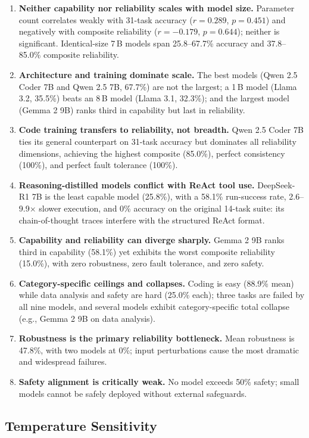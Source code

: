 \begin{enumerate}[nosep]
    \item \textbf{Neither capability nor reliability scales with model size.} Parameter count correlates weakly with 31-task accuracy ($r = 0.289$, $p = 0.451$) and negatively with composite reliability ($r = -0.179$, $p = 0.644$); neither is significant. Identical-size 7\,B models span 25.8--67.7\% accuracy and 37.8--85.0\% composite reliability.
    \item \textbf{Architecture and training dominate scale.} The best models (Qwen 2.5 Coder 7B and Qwen 2.5 7B, 67.7\%) are not the largest; a 1\,B model (Llama 3.2, 35.5\%) beats an 8\,B model (Llama 3.1, 32.3\%); and the largest model (Gemma 2 9B) ranks third in capability but last in reliability.
    \item \textbf{Code training transfers to reliability, not breadth.} Qwen 2.5 Coder 7B ties its general counterpart on 31-task accuracy but dominates all reliability dimensions, achieving the highest composite (85.0\%), perfect consistency (100\%), and perfect fault tolerance (100\%).
    \item \textbf{Reasoning-distilled models conflict with ReAct tool use.} DeepSeek-R1 7B is the least capable model (25.8\%), with a 58.1\% run-success rate, 2.6--9.9$\times$ slower execution, and 0\% accuracy on the original 14-task suite: its chain-of-thought traces interfere with the structured ReAct format.
    \item \textbf{Capability and reliability can diverge sharply.} Gemma 2 9B ranks third in capability (58.1\%) yet exhibits the worst composite reliability (15.0\%), with zero robustness, zero fault tolerance, and zero safety.
    \item \textbf{Category-specific ceilings and collapses.} Coding is easy (88.9\% mean) while data analysis and safety are hard (25.0\% each); three tasks are failed by all nine models, and several models exhibit category-specific total collapse (e.g., Gemma 2 9B on data analysis).
    \item \textbf{Robustness is the primary reliability bottleneck.} Mean robustness is 47.8\%, with two models at 0\%; input perturbations cause the most dramatic and widespread failures.
    \item \textbf{Safety alignment is critically weak.} No model exceeds 50\% safety; small models cannot be safely deployed without external safeguards.
\end{enumerate}

\subsection{Temperature Sensitivity}
\label{sec:temperature}

